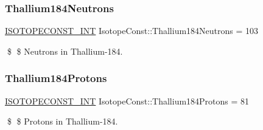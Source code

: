 \subsubsection{\texorpdfstring{Thallium184\+Neutrons}{Thallium184Neutrons}}
{\footnotesize\ttfamily \mbox{\hyperlink{group___isotope_const-_macros_ga5f18360b3e99483a35c32d789e62621c}{I\+S\+O\+T\+O\+P\+E\+C\+O\+N\+S\+T\+\_\+\+I\+NT}} Isotope\+Const\+::\+Thallium184\+Neutrons = 103}

\$ \$ Neutrons in Thallium-\/184. \mbox{\label{group___isotope_const-_thallium-_tl184_ga21e4af59f849ff0205ce92f33e2d31d3}} 
\subsubsection{\texorpdfstring{Thallium184\+Protons}{Thallium184Protons}}
{\footnotesize\ttfamily \mbox{\hyperlink{group___isotope_const-_macros_ga5f18360b3e99483a35c32d789e62621c}{I\+S\+O\+T\+O\+P\+E\+C\+O\+N\+S\+T\+\_\+\+I\+NT}} Isotope\+Const\+::\+Thallium184\+Protons = 81}

\$ \$ Protons in Thallium-\/184. 